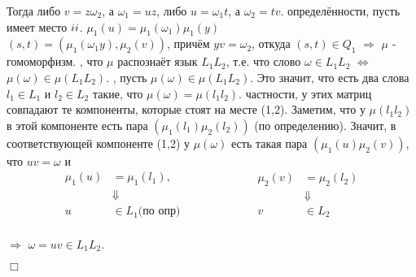 \documentclass[a4paper,12pt]{article}
\begin{document}
Тогда либо $v=z\omega_2$, а $\omega_1=uz$, либо $u=\omega_1t$, а $\omega_2=tv$.
 определённости, пусть имеет место $\uppercase\expandafter{\romannumeral 2}$.
 $\mu_1(u)=\mu_1(\omega_1)\mu_1(y)$
\\$(s,t)=(\mu_1(\omega_1y),\mu_2(v))$, причём $yv=\omega_2$, откуда $(s,t) \in Q_1$ $\Rightarrow$ $\mu$ - гомоморфизм.
, что $\mu$ распознаёт язык $L_1L_2$, т.е. что слово $\omega \in L_1L_2$ $\Leftrightarrow$ $\mu(\omega) \in \mu(L_1L_2)$.
, пусть $\mu(\omega) \in \mu(L_1L_2)$. Это значит, что есть два слова $l_1 \in L_1$ и $l_2 \in L_2$ такие, что $\mu(\omega)=\mu(l_1l_2)$.
 частности, у этих матриц совпадают те компоненты, которые стоят на месте (1,2). Заметим, что у $\mu(l_1l_2)$ в этой компоненте есть пара $(\mu_1(l_1)\mu_2(l_2))$ (по определению). Значит, в соответствующей компоненте (1,2) у $\mu(\omega)$ есть такая пара $(\mu_1(u)\mu_2(v))$, что $uv=\omega$ и
\\\notag\begin{equation}
\begin{split}\mu_1(u)&=\mu_1(l_1),\\ &\Downarrow \\ u &\in L_1 \textrm{(по опр)}\end{split}\quad\quad\quad\quad\quad\quad
\begin{split}\mu_2(v)&=\mu_2(l_2)\\ &\Downarrow \\ v &\in L_2\end{split}
\end{equation}
\\$\Rightarrow$  $\omega=uv \in L_1L_2$.\begin{flushright}$\Box$\end{flushright}
\end{document}
